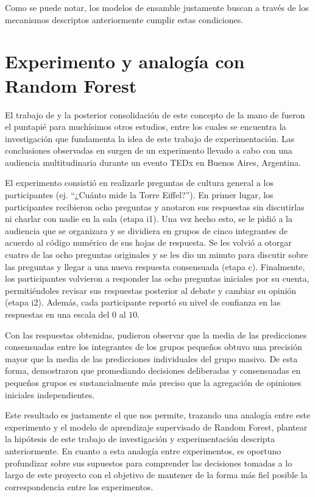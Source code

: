 Como se puede notar, los modelos de ensamble justamente buscan a través de los mecanismos descriptos anteriormente cumplir estas condiciones.

\section{Experimento y analogía con Random Forest}

El trabajo de \cite{galtonFrancis} y la posterior consolidación de este concepto de la mano de \cite{surowieckiWisdomCrowdsWhy2004} fueron el puntapié para muchísimos otros estudios, entre los cuales se encuentra la investigación que fundamenta la idea de este trabajo de experimentación. Las conclusiones observadas en \cite{navajasAggregatedKnowledge} surgen de un experimento llevado a cabo con una audiencia multitudinaria durante un evento TEDx en Buenos Aires, Argentina.

El experimento consistió en realizarle preguntas de cultura general a los participantes (ej. “¿Cuánto mide la Torre Eiffel?”). En primer lugar, los participantes recibieron ocho preguntas y anotaron sus respuestas sin discutirlas ni charlar con nadie en la sala (etapa i1). Una vez hecho esto, se le pidió a la audiencia que se organizara y se dividiera en grupos de cinco integrantes de acuerdo al código numérico de sus hojas de respuesta. Se les volvió a otorgar cuatro de las ocho preguntas originales y se les dio un minuto para discutir sobre las preguntas y llegar a una nueva respuesta consensuada (etapa c). Finalmente, los participantes volvieron a responder las ocho preguntas iniciales por su cuenta, permitiéndoles revisar sus respuestas posterior al debate y cambiar su opinión (etapa i2). Además, cada participante reportó su nivel de confianza en las respuestas en una escala del $0$ al $10$.

Con las respuestas obtenidas, pudieron observar que la media de las predicciones consensuadas entre los integrantes de los grupos pequeños obtuvo una precisión mayor que la media de las predicciones individuales del grupo masivo. De esta forma, demostraron que promediando decisiones deliberadas y consensuadas en pequeños grupos es sustancialmente más preciso que la agregación de opiniones iniciales independientes.

Este resultado es justamente el que nos permite, trazando una analogía entre este experimento y el modelo de aprendizaje supervisado de Random Forest, plantear la hipótesis de este trabajo de investigación y experimentación descripta anteriormente. En cuanto a esta analogía entre experimentos, es oportuno profundizar sobre sus supuestos para comprender las decisiones tomadas a lo largo de este proyecto con el objetivo de mantener de la forma más fiel posible la correspondencia entre los experimentos.


